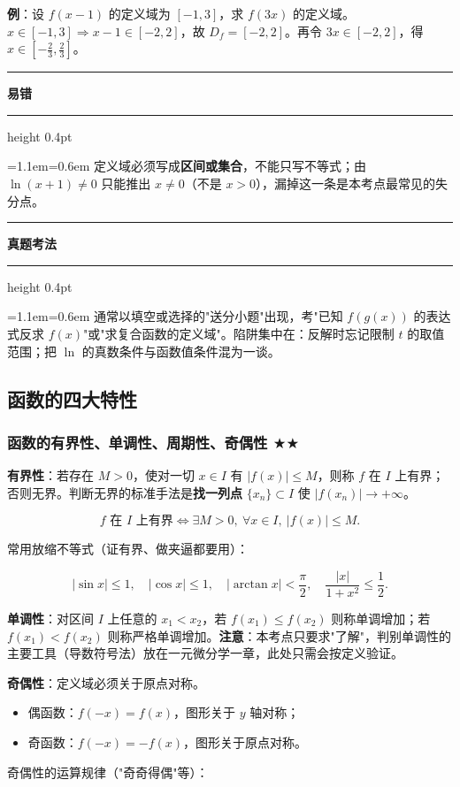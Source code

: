 \documentclass[11pt,openany,UTF8]{ctexbook}
\newcommand{\callouthead}[2]{%
  \par\addvspace{7pt}\noindent
  {\color{#1}\rule[-0.15em]{3pt}{1.05em}}\hspace{0.5em}%
  {\bfseries\color{#1}#2}\par\nobreak\vspace{-0.35em}%
  {\color{rulesep}\hrule height 0.4pt}\nobreak\vspace{0.45em}%
  \begingroup\small\setlength{\parindent}{0pt}%
  \leftskip=1.1em\rightskip=0.6em\noindent\ignorespaces}
\newcommand{\calloutend}{\par\endgroup\addvspace{7pt}}
\newenvironment{callwarn}[1]{\callouthead{warnbar}{#1}}{\calloutend}
\newenvironment{callexam}[1]{\callouthead{exambar}{#1}}{\calloutend}
\begin{document}
\textbf{例}：设 $f(x-1)$ 的定义域为 $[-1,3]$，求 $f(3x)$ 的定义域。 $x\in[-1,3]\Rightarrow x-1\in[-2,2]$，故 $D_f=[-2,2]$。再令 $3x\in[-2,2]$，得 $x\in\left[-\frac23,\frac23\right]$。

\begin{callwarn}{易错}
定义域必须写成\textbf{区间或集合}，不能只写不等式；由 $\ln(x+1)\ne 0$ 只能推出 $x\ne 0$（不是 $x>0$），漏掉这一条是本考点最常见的失分点。

\end{callwarn}

\begin{callexam}{真题考法}
通常以填空或选择的"送分小题"出现，考"已知 $f(g(x))$ 的表达式反求 $f(x)$"或"求复合函数的定义域"。陷阱集中在：反解时忘记限制 $t$ 的取值范围；把 $\ln$ 的真数条件与函数值条件混为一谈。

\end{callexam}

\subsection{函数的四大特性}

\subsubsection{函数的有界性、单调性、周期性、奇偶性 $\bigstar$$\bigstar$}

\textbf{有界性}：若存在 $M>0$，使对一切 $x\in I$ 有 $\vert f(x)\vert\le M$，则称 $f$ 在 $I$ 上有界；否则无界。判断无界的标准手法是\textbf{找一列点} $\{x_n\}\subset I$ 使 $\vert f(x_n)\vert\to+\infty$。

\[f \text{ 在 } I \text{ 上有界} \iff \exists M>0,\ \forall x\in I,\ \vert f(x)\vert\le M .\]

常用放缩不等式（证有界、做夹逼都要用）：

\[\vert\sin x\vert\le 1,\quad \vert\cos x\vert\le 1,\quad \vert\arctan x\vert<\frac{\pi}{2},\quad \frac{\vert x\vert}{1+x^2}\le\frac12 .\]

\textbf{单调性}：对区间 $I$ 上任意的 $x_1<x_2$，若 $f(x_1)\le f(x_2)$ 则称单调增加；若 $f(x_1)<f(x_2)$ 则称严格单调增加。\textbf{注意}：本考点只要求"了解"，判别单调性的主要工具（导数符号法）放在一元微分学一章，此处只需会按定义验证。

\textbf{奇偶性}：定义域必须关于原点对称。

\begin{itemize}
\item 偶函数：$f(-x)=f(x)$，图形关于 $y$ 轴对称；
\item 奇函数：$f(-x)=-f(x)$，图形关于原点对称。
\end{itemize}
奇偶性的运算规律（"奇奇得偶"等）：
\end{document}
